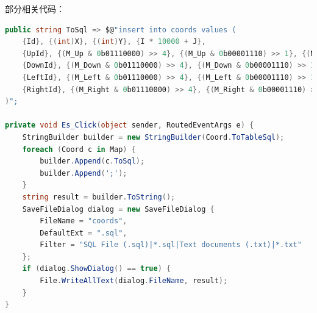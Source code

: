 部分相关代码：

\begin{lstlisting}[language=cs]
public string ToSql => $@"insert into coords values (
    {Id}, {(int)X}, {(int)Y}, {I * 10000 + J},
    {UpId}, {(M_Up & 0b01110000) >> 4}, {(M_Up & 0b00001110) >> 1}, {(M_Up & 0b00000001)},
    {DownId}, {(M_Down & 0b01110000) >> 4}, {(M_Down & 0b00001110) >> 1}, {(M_Down & 0b00000001)},
    {LeftId}, {(M_Left & 0b01110000) >> 4}, {(M_Left & 0b00001110) >> 1}, {(M_Left & 0b00000001)},
    {RightId}, {(M_Right & 0b01110000) >> 4}, {(M_Right & 0b00001110) >> 1}, {(M_Right & 0b00000001)}
)";

private void Es_Click(object sender, RoutedEventArgs e) {
    StringBuilder builder = new StringBuilder(Coord.ToTableSql);
    foreach (Coord c in Map) {
        builder.Append(c.ToSql);
        builder.Append(';');
    }
    string result = builder.ToString();
    SaveFileDialog dialog = new SaveFileDialog {
        FileName = "coords",
        DefaultExt = ".sql",
        Filter = "SQL File (.sql)|*.sql|Text documents (.txt)|*.txt"
    };
    if (dialog.ShowDialog() == true) {
        File.WriteAllText(dialog.FileName, result);
    }
}
\end{lstlisting}
